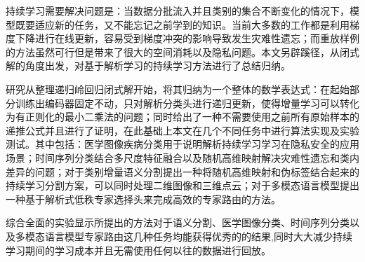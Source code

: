 \begin{abstractzh}

持续学习需要解决问题是：当数据分批流入并且类别的集合不断变化的情况下，模型既要适应新的任务，又不能忘记之前学到的知识。当前大多数的工作都是利用梯度下降进行在线更新，容易受到梯度冲突的影响导致发生灾难性遗忘；而重放样例的方法虽然可行但是带来了很大的空间消耗以及隐私问题。本文另辟蹊径，从闭式解的角度出发，对基于解析学习的持续学习方法进行了总结归纳。

研究从整理递归岭回归闭式解开始，将其归纳为一个整体的数学表达式：在起始部分训练出编码器固定不动，只对解析分类头进行递归更新，使得增量学习可以转化为有正则化的最小二乘法的问题；同时给出了一种不需要使用之前所有原始样本的递推公式并且进行了证明，在此基础上本文在几个不同任务中进行算法实现及实验测试。其中包括：医学图像疾病分类用于说明解析持续学习学习在隐私安全的应用场景；时间序列分类结合多尺度特征融合以及随机高维映射解决灾难性遗忘和类内差异的问题；对于类别增量语义分割提出一种将随机高维映射和伪标签结合起来的持续学习分割方案，可以同时处理二维图像和三维点云；对于多模态语言模型提出一种基于解析式低秩专家选择头来完成高效的专家路由的方法。

综合全面的实验显示所提出的方法对于语义分割、医学图像分类、时间序列分类以及多模态语言模型专家路由这几种任务均能获得优秀的的结果,同时大大减少持续学习期间的学习成本并且无需使用任何以往的数据进行回放。

\end{abstractzh}